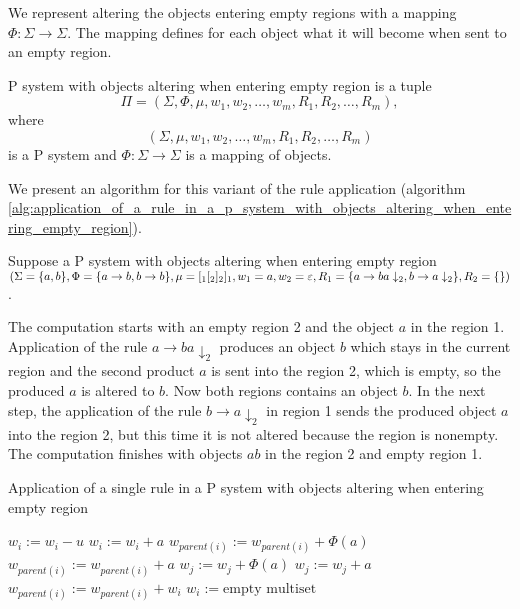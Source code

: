We represent altering the objects entering empty regions with a mapping $\Phi: \Sigma\rightarrow\Sigma$. The mapping defines for each object what it will become when sent to an empty region.

\begin{definition}
  P system with objects altering when entering empty region is a tuple $$\Pi = (\Sigma, \Phi, \mu, w_1, w_2,\ldots , w_m, R_1, R_2,\ldots , R_m),$$ where $$(\Sigma, \mu, w_1, w_2,\ldots , w_m, R_1, R_2,\ldots , R_m)$$ is a P system and $\Phi: \Sigma\rightarrow\Sigma$ is a mapping of objects.
\end{definition}

We present an algorithm for this variant of the rule application  (algorithm \ref{alg:application_of_a_rule_in_a_p_system_with_objects_altering_when_entering_empty_region}).

\begin{example}
  Suppose a P system with objects altering when entering empty region $(\Sigma = \{a,b\}, \Phi = \{a\rightarrow b, b\rightarrow b\}, \mu = [_1[_2]_2]_1, w_1 = a, w_2 = \varepsilon, \\R_1 = \{a\rightarrow ba\downarrow_2, b\rightarrow a\downarrow_2\}, R_2 = \{\})$.

  The computation starts with an empty region 2 and the object $a$ in the region 1. Application of the rule $a\rightarrow ba\downarrow_2$ produces an object $b$ which stays in the current region and the second product $a$ is sent into the region 2, which is empty, so the produced $a$ is altered to $b$. Now both regions contains an object $b$. In the next step, the application of the rule $b\rightarrow a\downarrow_2$ in region 1 sends the produced object $a$ into the region 2, but this time it is not altered because the region is nonempty. The computation finishes with objects $ab$ in the region 2 and empty region 1.
\end{example}

\begin{algorithm}
  \caption{Application of a single rule in a P system with objects altering when entering empty region}\label{alg:application_of_a_rule_in_a_p_system_with_objects_altering_when_entering_empty_region}
  \begin{algorithmic}[1]
      \State $w_i := w_i - u$
        \State $w_i := w_i + a$
      \EndFor
          \State $w_{parent(i)} := w_{parent(i)} + \Phi(a)$
        \Else
          \State $w_{parent(i)} := w_{parent(i)} + a$
        \EndIf
      \EndFor
          \State $w_j := w_j + \Phi(a)$
        \Else
          \State $w_j := w_j + a$
        \EndIf
      \EndFor
        \State $w_{parent(i)} := w_{parent(i)} + w_i$
        \State $w_i := \text{empty multiset}$
      \EndIf
    \EndProcedure
  \end{algorithmic}
\end{algorithm}

